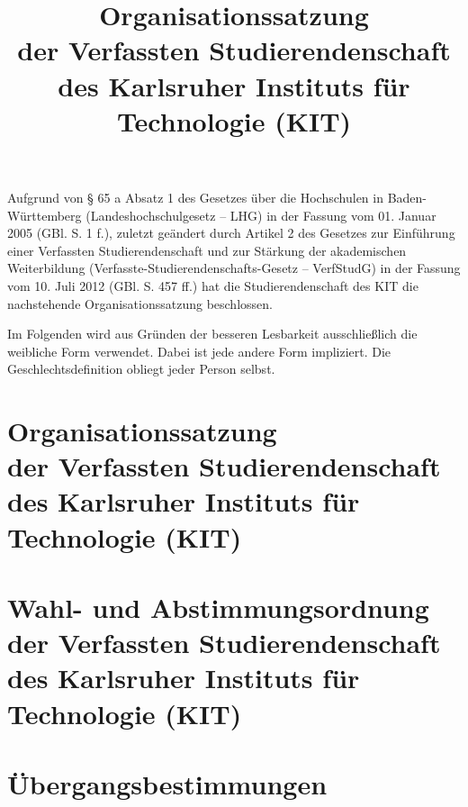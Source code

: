 \documentclass[a4paper,parskip=half,numbers=noenddot,twocolumn]{scrbook}
\title{Organisationssatzung \\ der Verfassten Studierendenschaft \\ des Karlsruher Instituts für Technologie (KIT)}
\author{}
\date{}
\begin{document}
\maketitle

\tableofcontents

Aufgrund von § 65 a Absatz 1 des Gesetzes über die Hochschulen in Baden-Württemberg (Landeshochschulgesetz -- LHG) in der Fassung vom 01. Januar 2005 (GBl. S. 1 f.), zuletzt geändert durch Artikel 2 des Gesetzes zur Einführung einer Verfassten Studierendenschaft und zur Stärkung der akademischen Weiterbildung (Verfasste-Studierendenschafts-Gesetz -- VerfStudG) in der Fassung vom 10. Juli 2012 (GBl. S. 457 ff.) hat die Studierendenschaft des KIT die nachstehende Organisationssatzung beschlossen.

Im Folgenden wird aus Gründen der besseren Lesbarkeit ausschließlich die weibliche Form verwendet. Dabei ist jede andere Form impliziert. Die Geschlechtsdefinition obliegt jeder Person selbst.




\part[Organisationssatzung]{Organisationssatzung \\ der Verfassten Studierendenschaft \\ des Karlsruher Instituts für Technologie (KIT)}




\part[Wahl- und Abstimmungsordnung]{Wahl- und Abstimmungsordnung \\ der Verfassten Studierendenschaft \\ des Karlsruher Instituts für Technologie (KIT)}




\part{Übergangsbestimmungen}



\end{document}
